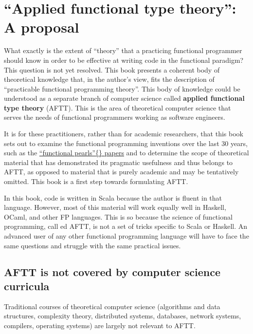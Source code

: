 
\chapter{``Applied functional type theory'': A proposal}

What exactly is the extent of ``theory'' that a practicing functional
programmer should know in order to be effective at writing code in
the functional paradigm? This question is not yet resolved. This book
presents a coherent body of theoretical knowledge that, in the author's
view, fits the description of ``practicable functional programming
theory''. This body of knowledge could be understood as a separate
branch of computer science called\textbf{ applied
functional type theory} (AFTT). This is the area of theoretical computer
science that serves the needs of functional programmers working as
software engineers.

It is for these practitioners, rather than for academic researchers,
that this book sets out to examine the functional programming inventions
over the last 30 years, \textendash{} such as the \href{https://wiki.haskell.org/Research_papers/Functional_pearls}{\textquotedblleft functional pearls\textquotedblright\{\} papers}
\textendash{} and to determine the scope of theoretical material that
has demonstrated its pragmatic usefulness and thus belongs to AFTT,
as opposed to material that is purely academic and may be tentatively
omitted. This book is a first step towards formulating AFTT.

In this book, code is written in Scala because the author is fluent
in that language. However, most of this material will work equally
well in Haskell, OCaml, and other FP languages. This is so because
the science of functional programming, call ed AFTT, is not a set
of tricks specific to Scala or Haskell. An advanced user of any other
functional programming language will have to face the same questions
and struggle with the same practical issues.

\section{AFTT is not covered by computer science curricula}

Traditional courses of theoretical computer science (algorithms and
data structures, complexity theory, distributed systems, databases,
network systems, compilers, operating systems) are largely not relevant
to AFTT.

